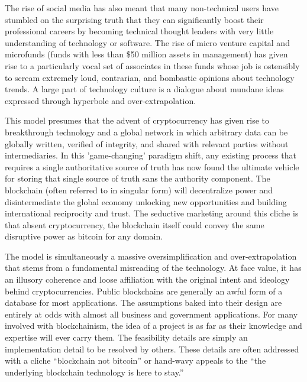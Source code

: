 
The rise of social media has also meant that many non-technical users have
stumbled on the surprising truth that they can significantly boost their
professional careers by becoming technical thought leaders with very little
understanding of technology or software. The rise of micro venture capital and
microfunds (funds with less than \$50 million assets in management) has given
rise to a particularly vocal set of associates in these funds whose job is
ostensibly to scream extremely loud, contrarian, and bombastic opinions about
technology trends. A large part of technology culture is a dialogue about
mundane ideas expressed through hyperbole and over-extrapolation.
\cite{baldwin_digital_2018, soatok_against_2021}


This model presumes that the advent of cryptocurrency has given rise to
breakthrough technology and a global network in which arbitrary data can be
globally written, verified of integrity, and shared with relevant parties
without intermediaries. In this 'game-changing' paradigm shift, any existing
process that requires a single authoritative source of truth has now found the
ultimate vehicle for storing that single source of truth sans the authority
component. The blockchain (often referred to in singular form) will decentralize
power and disintermediate the global economy unlocking new opportunities and
building international reciprocity and trust. The seductive marketing around
this cliche is that absent cryptocurrency, the blockchain itself could convey
the same disruptive power as bitcoin for any domain. \cite{schneier_theres_2019}

The model is simultaneously a massive oversimplification and over-extrapolation
that stems from a fundamental misreading of the technology. At face value, it
has an illusory coherence and loose affiliation with the original intent and
ideology behind cryptocurrencies. Public blockchains are generally an awful form
of a database for most applications. The assumptions baked into their design are
entirely at odds with almost all business and government applications. For many
involved with blockchainism, the idea of a project is as far as their knowledge
and expertise will ever carry them. The feasibility details are simply an
implementation detail to be resolved by others. These details are often
addressed with a cliche ``blockchain not bitcoin'' or hand-wavy appeals to the
``the underlying blockchain technology is here to stay.''
\cite{walch_deconstructing_2019, soatok_against_2021}

